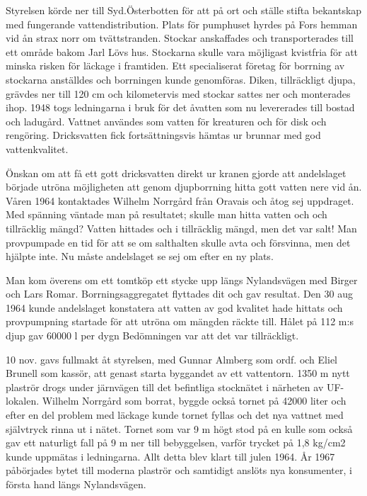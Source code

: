 
Styrelsen körde ner till Syd.Österbotten för att på ort och ställe stifta bekantskap med fungerande vattendistribution. Plats för pumphuset
hyrdes på Fors hemman vid ån strax norr om tvättstranden. Stockar anskaffades och transporterades till ett område bakom Jarl Lövs hus. Stockarna skulle vara möjligast kvistfria för att minska risken för läckage i framtiden. Ett specialiserat företag för borrning av stockarna
anställdes och borrningen kunde genomföras. Diken, tillräckligt djupa, grävdes ner till 120 cm och kilometervis med stockar sattes ner och
monterades ihop. 1948 togs ledningarna i bruk för det åvatten som nu levererades till bostad och ladugård. Vattnet användes som  vatten för
kreaturen och för disk och rengöring. Dricksvatten fick fortsättningsvis hämtas ur brunnar med god vattenkvalitet.

Önskan om att få ett gott dricksvatten direkt ur kranen gjorde att andelslaget började utröna möjligheten att genom djupborrning hitta gott vatten nere vid ån. Våren 1964 kontaktades Wilhelm Norrgård  från Oravais och åtog sej uppdraget. Med spänning väntade man på  resultatet; skulle man hitta vatten och och tillräcklig mängd? Vatten hittades och i tillräcklig mängd, men det var salt! Man provpumpade en tid för att se om salthalten skulle avta och försvinna, men det hjälpte inte. Nu måste andelslaget se sej om efter en ny plats.

Man kom överens om ett tomtköp ett stycke upp längs Nylandsvägen med Birger och Lars Romar. Borrningsaggregatet flyttades dit och gav resultat. Den 30 aug 1964 kunde andelslaget konstatera att vatten av god kvalitet hade hittats och provpumpning startade för att utröna om mängden räckte till. Hålet på 112 m:s djup gav 60000 l per dygn Bedömningen var att det var tillräckligt.

10 nov. gavs fullmakt åt styrelsen, med Gunnar Almberg som ordf. och Eliel Brunell som kassör, att genast starta byggandet av ett vattentorn. 1350 m nytt plaströr drogs under järnvägen till det befintliga stocknätet i närheten av UF-lokalen. Wilhelm Norrgård som borrat, byggde också tornet på 42000 liter och efter en del problem med läckage kunde tornet fyllas och det nya vattnet med självtryck rinna ut i nätet. Tornet som var 9 m högt stod på en kulle som också gav ett naturligt fall på 9 m ner till bebyggelsen, varför trycket på 1,8 kg/cm2 kunde uppmätas i ledningarna. Allt detta blev klart till julen 1964. År 1967 påbörjades bytet till moderna plaströr och samtidigt anslöts nya konsumenter, i första hand längs Nylandsvägen.


